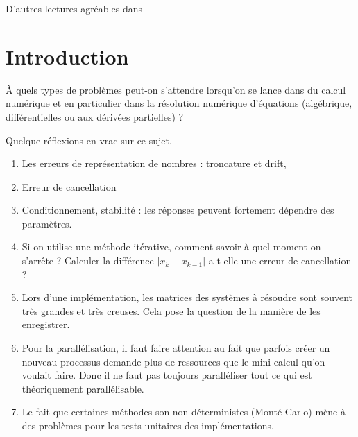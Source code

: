 
D'autres lectures agréables dans \cite{GianlucaB}

\section{Introduction}

À quels types de problèmes peut-on s'attendre lorsqu'on se lance dans du calcul numérique et en particulier dans la résolution numérique d'équations (algébrique, différentielles ou aux dérivées partielles) ?

Quelque réflexions en vrac sur ce sujet.

\begin{enumerate}
    \item
        Les erreurs de représentation de nombres : troncature et drift,
    \item
        Erreur de cancellation
    \item
        Conditionnement, stabilité : les réponses peuvent fortement dépendre des paramètres.
    \item
        Si on utilise une méthode itérative, comment savoir à quel moment on s'arrête ? Calculer la différence \( | x_k-x_{k-1} |\) a-t-elle une erreur de cancellation ?
    \item
        Lors d'une implémentation, les matrices des systèmes à résoudre sont souvent très grandes et très creuses. Cela pose la question de la manière de les enregistrer. 
    \item
        Pour la parallélisation, il faut faire attention au fait que parfois créer un nouveau processus demande plus de ressources que le mini-calcul qu'on voulait faire. Donc il ne faut pas toujours paralléliser tout ce qui est théoriquement parallélisable.
    \item
        Le fait que certaines méthodes son non-déterministes (Monté-Carlo) mène à des problèmes pour les tests unitaires des implémentations.
\end{enumerate}

